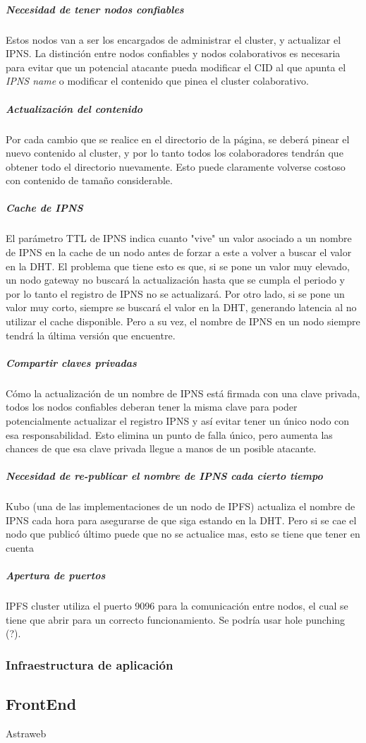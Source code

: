 \subparagraph{Necesidad de tener nodos confiables} Estos nodos van a ser los encargados de administrar el cluster, y actualizar el IPNS. La distinción entre nodos confiables y nodos colaborativos es necesaria para evitar que un potencial atacante pueda modificar el CID al que apunta el \textit{IPNS name} o modificar el contenido que pinea el cluster colaborativo.
 
\subparagraph{Actualización del contenido} Por cada cambio que se realice en el directorio de la página, se deberá pinear el nuevo contenido al cluster, y por lo tanto todos los colaboradores tendrán que obtener todo el directorio nuevamente. Esto puede claramente volverse costoso con contenido de tamaño considerable.
    
\subparagraph{Cache de IPNS} El parámetro TTL de IPNS indica cuanto "vive" un valor asociado a un nombre de IPNS en la cache de un nodo antes de forzar a este a volver a buscar el valor en la DHT. El problema que tiene esto es que, si se pone un valor muy elevado, un nodo gateway no buscará la actualización hasta que se cumpla el periodo y por lo tanto el registro de IPNS no se actualizará. Por otro lado, si se pone un valor muy corto, siempre se buscará el valor en la DHT, generando latencia al no utilizar el cache disponible. Pero a su vez, el nombre de IPNS en un nodo siempre tendrá la última versión que encuentre.

\subparagraph{Compartir claves privadas} Cómo la actualización de un nombre de IPNS está firmada con una clave privada, todos los nodos confiables deberan tener la misma clave para poder potencialmente actualizar el registro IPNS y así evitar tener un único nodo con esa responsabilidad. Esto elimina un punto de falla único, pero aumenta las chances de que esa clave privada llegue a manos de un posible atacante.

\subparagraph{Necesidad de re-publicar el nombre de IPNS cada cierto tiempo} Kubo (una de las implementaciones de un nodo de IPFS) actualiza el nombre de IPNS cada hora para asegurarse de que siga estando en la DHT. Pero si se cae el nodo que publicó último puede que no se actualice mas, esto se tiene que tener en cuenta

\subparagraph{Apertura de puertos} IPFS cluster utiliza el puerto 9096 para la comunicación entre nodos, el cual se tiene que abrir para un correcto funcionamiento. Se podría usar hole punching (?).

\subsubsection{Infraestructura de aplicación}



\subsection{FrontEnd}

Astraweb